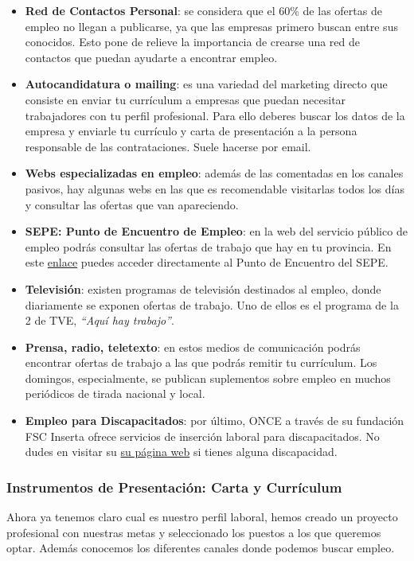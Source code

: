 \begin{itemize}
    \item \textbf{Red de Contactos Personal}: se considera que el 60\% de las ofertas de empleo no llegan a publicarse, ya que las empresas primero buscan entre sus conocidos. Esto pone de relieve la importancia de crearse una red de contactos que puedan ayudarte a encontrar empleo.
    \item \textbf{Autocandidatura o mailing}: es una variedad del marketing directo que consiste en enviar tu currículum a empresas que puedan necesitar trabajadores con tu perfil profesional. Para ello deberes buscar los datos de la empresa y enviarle tu currículo y carta de presentación a la persona responsable de las contrataciones. Suele hacerse por email.
    \item \textbf{Webs especializadas en empleo}: además de las comentadas en los canales pasivos, hay algunas webs en las que es recomendable visitarlas todos los días y consultar las ofertas que van apareciendo.
    \item \textbf{SEPE: Punto de Encuentro de Empleo}: en la web del servicio público de empleo podrás consultar las ofertas de trabajo que hay en tu provincia. En este \href{https://www.empleate.gob.es/empleo/#/trabajo?search=*&pag=0}{enlace} puedes acceder directamente al Punto de Encuentro del SEPE.
    \item \textbf{Televisión}: existen programas de televisión destinados al empleo, donde diariamente se exponen ofertas de trabajo. Uno de ellos es el programa de la 2 de TVE, \textit{``Aquí hay trabajo''}.
    \item \textbf{Prensa, radio, teletexto}: en estos medios de comunicación podrás encontrar ofertas de trabajo a las que podrás remitir tu currículum. Los domingos, especialmente, se publican suplementos sobre empleo en muchos periódicos de tirada nacional y local.
    \item \textbf{Empleo para Discapacitados}: por último, ONCE a través de su fundación FSC Inserta ofrece servicios de inserción laboral para discapacitados. No dudes en visitar su \href{https://www.insertaempleo.es/}{su página web} si tienes alguna discapacidad.
\end{itemize}

\subsubsection{Instrumentos de Presentación: Carta y Currículum}
Ahora ya tenemos claro cual es nuestro perfil laboral, hemos creado un proyecto profesional con nuestras metas y seleccionado los puestos a los que queremos optar. Además conocemos los diferentes canales donde podemos buscar empleo.

